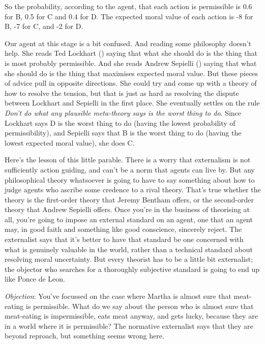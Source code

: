\documentclass[
  11pt,
  letterpaper,
  DIV=11,
  numbers=noendperiod,
  twoside]{scrartcl}
\begin{document}
So the probability, according to the agent, that each action is
permissible is 0.6 for B, 0.5 for C and 0.4 for D. The expected moral
value of each action is -8 for B, -7 for C, and -2 for D.

Our agent at this stage is a bit confused. And reading some philosophy
doesn't help. She reads Ted Lockhart ()
saying that what she should do is the thing that is most probably
permissible. And she reads Andrew Sepielli
() saying that what she should do is
the thing that maximises expected moral value. But these pieces of
advice pull in opposite directions. She could try and come up with a
theory of how to resolve the tension, but that is just as hard as
resolving the dispute between Lockhart and Sepielli in the first place.
She eventually settles on the rule \emph{Don't do what any plausible
meta-theory says is the worst thing to do}. Since Lockhart says D is the
worst thing to do (having the lowest probability of permissibility), and
Sepielli says that B is the worst thing to do (having the lowest
expected moral value), she does C.

Here's the lesson of this little parable. There is a worry that
externalism is not sufficiently action guiding, and can't be a norm that
agents can live by. But any philosophical theory whatsoever is going to
have to say something about how to judge agents who ascribe some
credence to a rival theory. That's true whether the theory is the
first-order theory that Jeremy Bentham offers, or the second-order
theory that Andrew Sepielli offers. Once you're in the business of
theorising at all, you're going to impose an external standard on an
agent, one that an agent may, in good faith and something like good
conscience, sincerely reject. The externalist says that it's better to
have that standard be one concerned with what is genuinely valuable in
the world, rather than a technical standard about resolving moral
uncertainty. But every theorist has to be a little bit externalist; the
objector who searches for a thoroughly subjective standard is going to
end up like Ponce de Leon.

\emph{Objection}: You've focussed on the case where Martha is almost
sure that meat-eating is permissible. What do we say about the person
who is almost sure that meat-eating is impermissible, eats meat anyway,
and gets lucky, because they are in a world where it is permissible? The
normative externalist says that they are beyond reproach, but something
seems wrong here.
\end{document}
